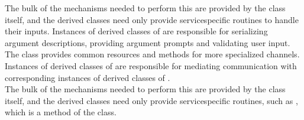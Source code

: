 The bulk of the mechanisms needed to perform this are provided by the
 class itself, and the derived classes need only
provide service\longDash{}specific routines to handle their inputs.
Instances of derived classes of  are
responsible for serializing argument descriptions, providing argument prompts and
validating user input.
\condPage
{}
The class  provides common resources and methods for more
specialized channels.
Instances of derived classes of  are responsible for
mediating \mplusm{} communication with corresponding instances of derived classes of
.\\

The bulk of the mechanisms needed to perform this are provided by the
 class itself, and the derived classes need only provide
service\longDash{}specific routines, such as , which is a
method of the  class.\\

